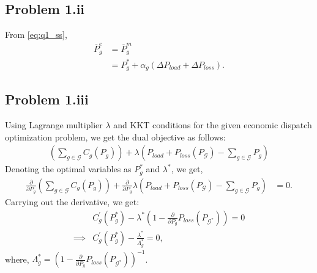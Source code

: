 \subsection*{Problem 1.ii}
From \ref{eq:q1_ss},
\begin{align*}
	\overline{P}_g^e &= \overline{P}_g^m\\
	&= P_{g}^*+\alpha_g \left(\Delta P_{load} + \Delta P_{loss}\right).
\end{align*}
\subsection*{Problem 1.iii}
Using Lagrange multiplier $\lambda$ and KKT conditions for the given economic dispatch optimization problem, we get the dual objective as follows:
\begin{align*}
	\left(\sum_{g \in \mathcal{G}}C_g(P_g)\right) + \lambda \left(P_{load}+P_{loss}(P_{\mathcal{G}}) - \sum_{g\in \mathcal{G}}P_g\right)
\end{align*}
Denoting the optimal variables as $P_g^*$ and $\lambda^*$, we get,
\begin{align*}
	\frac{\partial}{\partial P_g} \left(\sum_{g \in \mathcal{G}}C_g(P_g)\right)+\frac{\partial}{\partial P_g}\lambda \left(P_{load}+P_{loss}(P_{\mathcal{G}}) - \sum_{g\in \mathcal{G}}P_g\right) &= 0.
\end{align*}
Carrying out the derivative, we get:
\begin{align}\label{eq:q1_kkt}
	& C^{\prime}_g(P_g^*) - \lambda^* \left(1-\frac{\partial}{\partial P_g}P_{loss}(P_{\mathcal{G}^*})\right) = 0 \nonumber\\
	\implies & C^{\prime}_g(P_g^*) - \frac{\lambda^*}{\Lambda_g^*} = 0,
\end{align}
where, $\Lambda_g^* = \left(1-\frac{\partial}{\partial P_g}P_{loss}(P_{\mathcal{G}^*})\right)^{-1}$.
